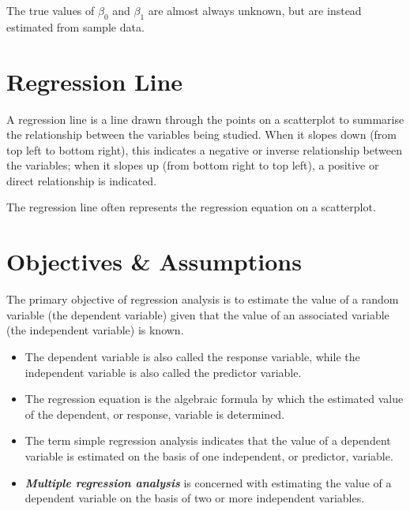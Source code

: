 \documentclass[]{report}
\begin{document}
The true values of $\beta_0$ and  $\beta_1$ are almost always unknown, but are instead estimated from sample data.

	

\section{Regression Line}




A regression line is a line drawn through the points on a scatterplot to summarise the relationship between the variables being studied. When it slopes down (from top left to bottom right), this indicates a negative or inverse relationship between the variables; when it slopes up (from bottom right to top left), a positive or direct relationship is indicated.

The regression line often represents the regression equation on a scatterplot.



\section*{Objectives \& Assumptions} 

The primary objective of regression analysis is to estimate the value of a random variable (the dependent
variable) given that the value of an associated variable (the independent variable) is known. 

\begin{itemize}
	\item The dependent
	variable is also called the response variable, while the independent variable is also called the predictor
	variable. 
	
	\item The regression equation is the algebraic formula by which the estimated value of the dependent, or
	response, variable is determined.
	\item The term simple regression analysis indicates that the value of a dependent variable is estimated on the
	basis of one independent, or predictor, variable.
	
	\item \textit{\textbf{Multiple regression analysis}} is
	concerned with estimating the value of a dependent variable on the basis of two or more independent variables.
\end{itemize}
\end{document}
